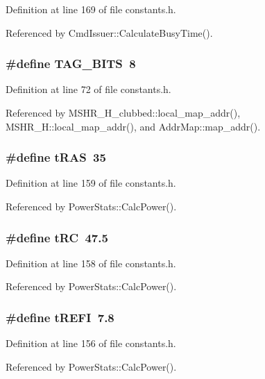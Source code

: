 Definition at line 169 of file constants.h.

Referenced by CmdIssuer::CalculateBusyTime().
\subsubsection[{TAG\_\-BITS}]{\setlength{\rightskip}{0pt plus 5cm}\#define TAG\_\-BITS~8}\label{constants_8h_273bfff4ad6c875e1d4ca56b70a23137}




Definition at line 72 of file constants.h.

Referenced by MSHR\_\-H\_\-clubbed::local\_\-map\_\-addr(), MSHR\_\-H::local\_\-map\_\-addr(), and AddrMap::map\_\-addr().
\subsubsection[{tRAS}]{\setlength{\rightskip}{0pt plus 5cm}\#define tRAS~35}\label{constants_8h_f94211ded98007d639518ae933c20b7c}




Definition at line 159 of file constants.h.

Referenced by PowerStats::CalcPower().
\subsubsection[{tRC}]{\setlength{\rightskip}{0pt plus 5cm}\#define tRC~47.5}\label{constants_8h_ded47a015ec503f4e200b296d973ebea}




Definition at line 158 of file constants.h.

Referenced by PowerStats::CalcPower().
\subsubsection[{tREFI}]{\setlength{\rightskip}{0pt plus 5cm}\#define tREFI~7.8}\label{constants_8h_df667048f980207f6e150a3d037d685c}




Definition at line 156 of file constants.h.

Referenced by PowerStats::CalcPower().
